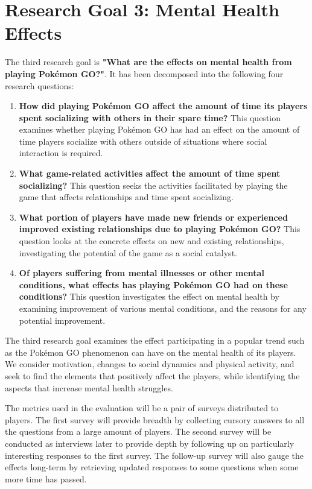 \section{Research Goal 3: Mental Health Effects}
\label{rg3}

The third research goal is \textbf{"What are the effects on mental health from playing Pokémon GO?"}. It has been decomposed into the following four research questions:

\begin{enumerate}[label=RQ3.{\arabic*}]
	\item \textbf{How did playing Pokémon GO affect the amount of time its players spent socializing with others in their spare time?}\label{rq-mental-social-activity-amount}
		This question examines whether playing Pokémon GO has had an effect on the amount of time players socialize with others outside of situations where social interaction is required.
	\item \textbf{What game-related activities affect the amount of time spent socializing?}\label{rq-mental-game-activities}
		This question seeks the activities facilitated by playing the game that affects relationships and time spent socializing.
	\item \textbf{What portion of players have made new friends or experienced improved existing relationships due to playing Pokémon GO?}\label{rq-mental-relationships}
		This question looks at the concrete effects on new and existing relationships, investigating the potential of the game as a social catalyst.
	\item \textbf{Of players suffering from mental illnesses or other mental conditions, what effects has playing Pokémon GO had on these conditions?}\label{rq-mental-illnesses}
		This question investigates the effect on mental health by examining improvement of various mental conditions, and the reasons for any potential improvement.
\end{enumerate}

The third research goal examines the effect participating in a popular trend such as the Pokémon GO phenomenon can have on the mental health of its players. We consider motivation, changes to social dynamics and physical activity, and seek to find the elements that positively affect the players, while identifying the aspects that increase mental health struggles.

The metrics used in the evaluation will be a pair of surveys distributed to players. The first survey will provide breadth by collecting cursory answers to all the questions from a large amount of players. The second survey will be conducted as interviews later to provide depth by following up on particularly interesting responses to the first survey. The follow-up survey will also gauge the effects long-term by retrieving updated responses to some questions when some more time has passed.
